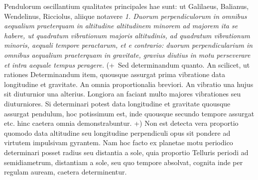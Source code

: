 \pstart Pendulorum\protect{} oscillantium qualitates principales hae sunt: ut Galilaeus\protect{}, Balianus\protect{}, Wendelinus\protect{}, Ricciolus\protect{}, aliique notavere \textit{1. Duorum perpendiculorum in omnibus aequalium praeterquam in altitudine altitudinem minorem ad majorem ita se  habere, ut quadratum vibrationum majoris altitudinis, ad quadratum vibrationum minoris, aequali tempore peractarum, et e contrario: duorum perpendicularium in omnibus aequalium praeterquam  in }\textit{gravitate}\protect{}\textit{, gravius diutius in motu perseverare  et intra aequale tempus }\textit{ peragere.} (+~Sed determinandum quanto. An  scilicet, ut rationes  Determinandum  item, quousque assurgat prima vibratione data longitudine et gravitate\protect{}. An  omnia proportionalia breviori. An vibratio  una hujus sit diuturnior una alterius. Longiora an faciant multo majores vibrationes seu diuturniores. Si determinari  potest data longitudine et gravitate\protect{} quousque assurgat pendulum\protect{}, hoc potissimum est, inde quousque secundo tempore  assurgat etc. hinc caetera omnia demonstrabuntur. +) Non  est detecta vera proportio quomodo data altitudine  seu longitudine perpendiculi opus sit pondere ad virtutem  impulsivam gyrantem. Nam hoc facto ex planetae motu periodico determinari posset radius seu distantia a sole\protect{},  quia proportio Telluris\protect{} periodi ad semidiametrum, distantiam  a sole, seu quo tempore absolvat, cognita inde per  regulam auream, caetera determinentur.
\pend 
